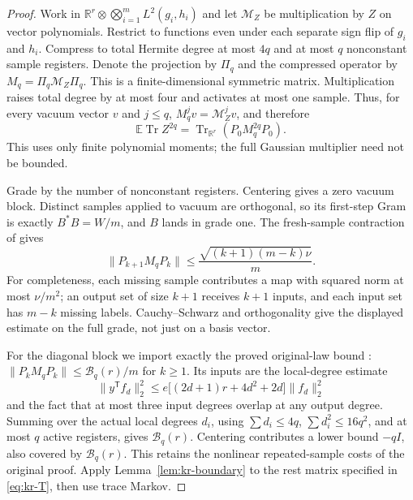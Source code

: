 \documentclass[11pt,a4paper]{article}
\theoremstyle{definition}\newtheorem{definition}[theorem]{Definition}
\theoremstyle{remark}\newtheorem{remark}[theorem]{Remark}
\numberwithin{equation}{section}
\begin{document}
\begin{proof}
Work in $\mathbb R^r\otimes\bigotimes_{i=1}^mL^2(g_i,h_i)$ and let
$\mathcal M_Z$ be multiplication by $Z$ on vector polynomials. Restrict to
functions even under each separate sign flip of $g_i$ and $h_i$. Compress
to total Hermite degree at most $4q$ and at most $q$ nonconstant sample
registers. Denote the projection by $\Pi_q$ and the compressed operator by
$M_q=\Pi_q\mathcal M_Z\Pi_q$.
This is a finite-dimensional symmetric matrix. Multiplication raises total
degree by at most four and activates at most one sample. Thus, for every
vacuum vector $v$ and $j\le q$,
$M_q^jv=\mathcal M_Z^jv$, and therefore
\[
 \mathbb E\operatorname{Tr}Z^{2q}
 =\operatorname{Tr}_{\mathbb R^r}(P_0M_q^{2q}P_0).
\]
This uses only finite polynomial moments; the full Gaussian multiplier need
not be bounded.

Grade by the number of nonconstant registers. Centering gives a zero vacuum
block. Distinct samples applied to vacuum are orthogonal, so its first-step
Gram is exactly $B^*B=W/m$, and $B$ lands in grade one. The fresh-sample
contraction of \cite[Chain C, ``Fresh-sample contraction'']{KRSource} gives
\[
 \|P_{k+1}M_qP_k\|
 \le\frac{\sqrt{(k+1)(m-k)\nu}}m.
\]
For completeness, each missing sample contributes a map with squared norm
at most $\nu/m^2$; an output set of size $k+1$ receives $k+1$ inputs, and
each input set has $m-k$ missing labels. Cauchy--Schwarz and orthogonality
give the displayed estimate on the full grade, not just on a basis vector.

For the diagonal block we import exactly the proved original-law bound
\cite[Chain C, ``Sum of already-active sample interactions'']{KRSource}:
$\|P_kM_qP_k\|\le\mathcal B_q(r)/m$ for $k\ge1$.
Its inputs are the local-degree estimate
\[
 \|y^{\mathsf T}f_d\|_2^2
 \le e\bigl[(2d+1)r+4d^2+2d\bigr]\|f_d\|_2^2
\]
and the fact that at most three input degrees overlap at any output degree.
Summing over the actual local degrees $d_i$, using
$\sum d_i\le4q$, $\sum d_i^2\le16q^2$, and at most $q$ active registers,
gives $\mathcal B_q(r)$. Centering contributes a lower bound $-qI$, also
covered by $\mathcal B_q(r)$. This retains the nonlinear repeated-sample
costs of the original proof. Apply Lemma~\ref{lem:kr-boundary} to the rest
matrix specified in \eqref{eq:kr-T}, then use trace Markov.
\end{proof}
\end{document}
